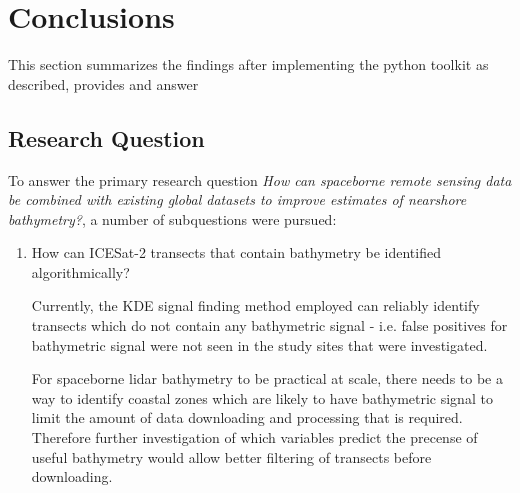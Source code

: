 \chapter{Conclusions}
This section summarizes the findings after implementing the python toolkit as described, provides and answer
\section{Research Question}
To answer the primary research question \emph{How can spaceborne remote sensing data be combined with existing global datasets to improve estimates of nearshore bathymetry?}, a number of subquestions were pursued:

\begin{enumerate}
    \item How can ICESat-2 transects that contain bathymetry be identified algorithmically?

    
    Currently, the KDE signal finding method employed can reliably identify transects which do not contain any bathymetric signal - i.e. false positives for bathymetric signal were not seen in the study sites that were investigated. 
    
    For spaceborne lidar bathymetry to be practical at scale, there needs to be a way to identify coastal zones which are likely to have bathymetric signal to limit the amount of data downloading and processing that is required. Therefore further investigation of which variables predict the precense of useful bathymetry would allow better filtering of transects before downloading.


\end{enumerate}
